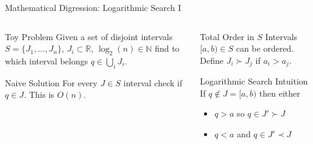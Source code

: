 \documentclass[xetex, handout]{beamer}
\begin{document}
\begin{frame}[fragile]{Mathematical Digression: Logarithmic Search I}
  \begin{center}
  \end{center}
  \begin{columns}[t]
    \begin{column}{.45\linewidth}
      \begin{block}{Toy Problem}
        Given a set of disjoint intervals $S = \{J_1, \ldots, J_n\}$, $J_i
        \subset \mathbb{R}$, $\log_2(n) \in \mathbb{N}$ find to which interval
        belongs $q \in \bigcup_i J_i$.
      \end{block}
      \begin{block}{Naive Solution}
        For every $J \in S$ interval check if $q \in J$. This is $O(n)$.
      \end{block}
    \end{column}
    \begin{column}{.55\linewidth}
      \begin{alertblock}{Total Order in $S$}
        Intervals $[a, b) \in S$ can be ordered. Define 
        $J_i \succ J_j$ if $a_i > a_j$.
      \end{alertblock}
      \begin{block}{Logarithmic Search Intuition}
        If $q \notin J = [a,b)$ then either
        \begin{itemize}
          \item $q > a$ so $q \in J' \succ J$
          \item $q < a$ and $q \in J' \prec J$
        \end{itemize}
      \end{block}
    \end{column}
  \end{columns}
\end{frame}
\end{document}
